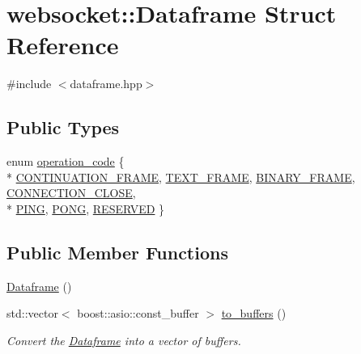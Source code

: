 \hypertarget{structwebsocket_1_1Dataframe}{}\section{websocket\+:\+:Dataframe Struct Reference}
\label{structwebsocket_1_1Dataframe}


{\ttfamily \#include $<$dataframe.\+hpp$>$}

\subsection*{Public Types}
\begin{DoxyCompactItemize}
\item 
enum \hyperlink{structwebsocket_1_1Dataframe_ab6f63b062b0aff036c2cbdecf160bd84}{operation\+\_\+code} \{ \\*
\hyperlink{structwebsocket_1_1Dataframe_ab6f63b062b0aff036c2cbdecf160bd84a9bf39e33295885bbf8be0b3335d0d4d6}{C\+O\+N\+T\+I\+N\+U\+A\+T\+I\+O\+N\+\_\+\+F\+R\+A\+ME}, 
\hyperlink{structwebsocket_1_1Dataframe_ab6f63b062b0aff036c2cbdecf160bd84adea20051b65663cc4eea0162e2f2dad1}{T\+E\+X\+T\+\_\+\+F\+R\+A\+ME}, 
\hyperlink{structwebsocket_1_1Dataframe_ab6f63b062b0aff036c2cbdecf160bd84a1f22c794d0daa62a1f60d777425ce646}{B\+I\+N\+A\+R\+Y\+\_\+\+F\+R\+A\+ME}, 
\hyperlink{structwebsocket_1_1Dataframe_ab6f63b062b0aff036c2cbdecf160bd84ac28582920eaf67c2f7d355e67209c0ae}{C\+O\+N\+N\+E\+C\+T\+I\+O\+N\+\_\+\+C\+L\+O\+SE}, 
\\*
\hyperlink{structwebsocket_1_1Dataframe_ab6f63b062b0aff036c2cbdecf160bd84afe00cd2796e340b9762add122db96bae}{P\+I\+NG}, 
\hyperlink{structwebsocket_1_1Dataframe_ab6f63b062b0aff036c2cbdecf160bd84ae5bed00b4b0ad675819b436b28fd6ea8}{P\+O\+NG}, 
\hyperlink{structwebsocket_1_1Dataframe_ab6f63b062b0aff036c2cbdecf160bd84aeffe25f15a0bae70219c3cbdb08dee02}{R\+E\+S\+E\+R\+V\+ED}
 \}
\end{DoxyCompactItemize}
\subsection*{Public Member Functions}
\begin{DoxyCompactItemize}
\item 
\hyperlink{structwebsocket_1_1Dataframe_a69124a202dd00df1ffa221ff7394985f}{Dataframe} ()
\item 
std\+::vector$<$ boost\+::asio\+::const\+\_\+buffer $>$ \hyperlink{structwebsocket_1_1Dataframe_ab89bdc83b95811bd20f26ae040b4f0f8}{to\+\_\+buffers} ()
\begin{DoxyCompactList}\small\item\em Convert the \hyperlink{structwebsocket_1_1Dataframe}{Dataframe} into a vector of buffers. \end{DoxyCompactList}\end{DoxyCompactItemize}
